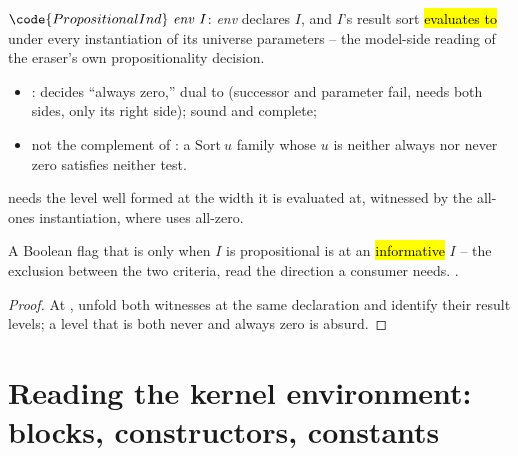 \begin{definition}
\label{def:PropositionalInd}
\leanok
{}
 $\code{PropositionalInd}\ \mathit{env}\ I$: \emph{env} declares $I$, and $I$'s
result sort \hl{evaluates to } under every instantiation of its universe parameters
-- the model-side reading of the eraser's own propositionality decision.
\begin{itemize}
\item {}: decides ``always zero,'' dual to  (successor and
parameter fail,  needs both sides,  only its right side); sound and
complete;
\item not the complement of : a $\mathrm{Sort}\ u$ family whose $u$ is
neither always nor never zero satisfies neither test.
\end{itemize}
  needs the level well formed at the width it is
evaluated at, witnessed by the all-ones instantiation, where  uses
all-zero.
\end{definition}

\begin{lemma}
\label{lem:propositional_false_of_informative}
\leanok
{}
 A Boolean flag that is  only when $I$ is propositional is
 at an \hl{informative} $I$ -- the exclusion between the two criteria, read the
direction a consumer needs.
 \stProved{}.
\end{lemma}
\begin{proof}
\leanok
{}
 At , unfold both witnesses at the same declaration and identify their
result levels; a level that is both never and always zero is absurd.
\end{proof}

\section{Reading the kernel environment: blocks, constructors, constants}
\label{sec:erases:readings}

